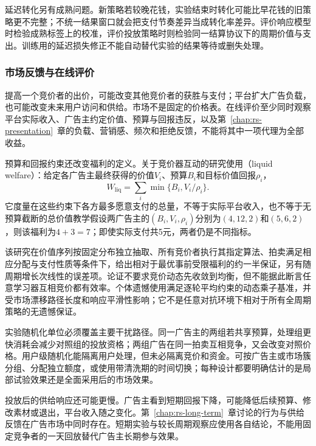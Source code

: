 延迟转化另有成熟问题。新策略若较晚花钱，实验结束时转化可能比早花钱的旧策略更不完整；不统一结果窗口就会把支付节奏差异当成转化率差异。评价响应模型时检验成熟标签上的校准，评价投放策略时则检验同一结算协议下的周期价值与支出。训练用的延迟损失修正不能自动替代实验的结果等待或删失处理。

\subsubsection{市场反馈与在线评价}
\label{sec:rs-advertising-market}

提高一个竞价者的出价，可能改变其他竞价者的获胜与支付；平台扩大广告负载，也可能改变未来用户访问和供给。市场不是固定的价格表。在线评价至少同时观察平台实际收入、广告主约定价值、预算与回报违反，以及第~\ref{chap:rs-presentation}~章的负载、营销感、频次和拒绝反馈，不能将其中一项代理为全部收益。

预算和回报约束还改变福利的定义。关于竞价器互动的研究使用（liquid welfare）：给定各广告主最终获得的价值$V_i$、预算$B_i$和目标价值回报$\rho_i$，
\begin{equation}
  W_{\mathrm{liq}}=\sum_i\min\{B_i,V_i/\rho_i\}.
  \label{eq:rs-advertising-liquid}
\end{equation}
它度量在这些约束下各方最多愿意支付的总量，不等于实际平台收入，也不等于无预算截断的总价值教学假设两广告主的$(B_i,V_i,\rho_i)$分别为$(4,12,2)$和$(5,6,2)$，则该福利为$4+3=7$；即使实际支付共5元，两者仍是不同指标。

该研究在价值序列按固定分布独立抽取、所有竞价者执行其指定算法、拍卖满足相应分配与支付性质等条件下，给出相对于最优事前受限福利的约一半保证，另有随周期增长次线性的误差项。论证不要求竞价动态先收敛到均衡，但不能据此断言任意学习器互相竞价都有效率。个体遗憾使用满足逐轮平均约束的动态乘子基准，并受市场漂移路径长度和响应平滑性影响；它不是任意对抗环境下相对于所有全周期策略的无遗憾保证。

实验随机化单位必须覆盖主要干扰路径。同一广告主的两组若共享预算，处理组更快消耗会减少对照组的投放资格；两组广告在同一拍卖互相竞争，又会改变对照价格。用户级随机化能隔离用户处理，但未必隔离竞价和资金。可按广告主或市场簇分组、分配独立额度，或使用带清洗期的时间切换；每种设计都要明确估计的是局部试验效果还是全面采用后的市场效果。

投放后的供给响应还可能更慢。广告主看到短期回报下降，可能降低后续预算、修改素材或退出，平台收入随之变化。第~\ref{chap:rs-long-term}~章讨论的行为与供给反馈在广告市场中同时存在。短期实验与较长周期观察应使用各自结论，不能用固定竞争者的一天回放替代广告主长期参与效果。

